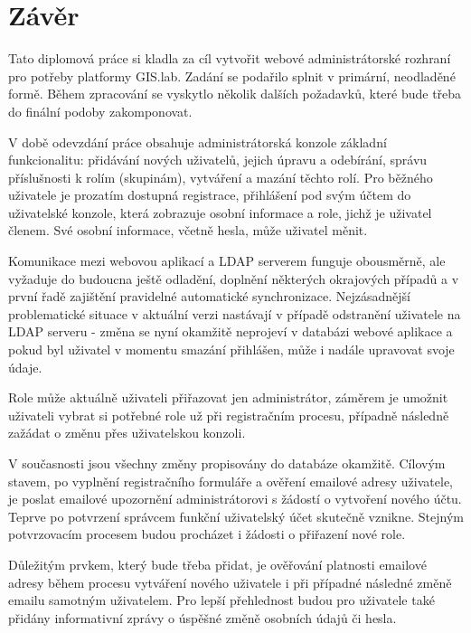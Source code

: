 \chapter*{Závěr}
\label{5-zaver}


Tato diplomová práce si kladla za cíl vytvořit webové administrátorské rozhraní pro potřeby platformy GIS.lab. Zadání se podařilo splnit v primární, neodladěné formě. Během zpracování se vyskytlo několik dalších požadavků, které bude třeba do finální podoby zakomponovat.

V době odevzdání práce obsahuje administrátorská konzole základní funkcionalitu: přidávání nových uživatelů, jejich úpravu a odebírání, správu příslušnosti k rolím (skupinám), vytváření a mazání těchto rolí. Pro běžného uživatele je prozatím dostupná registrace, přihlášení pod svým účtem do uživatelské konzole, která zobrazuje osobní informace a role, jichž je uživatel členem. Své osobní informace, včetně hesla, může uživatel měnit. 

Komunikace mezi webovou aplikací a LDAP serverem funguje obousměrně, ale vyžaduje do budoucna ještě odladění, doplnění některých okrajových případů a v první řadě zajištění pravidelné automatické synchronizace. Nejzásadnější problematické situace v aktuální verzi nastávají v případě odstranění uživatele na LDAP serveru - změna se nyní okamžitě neprojeví v databázi webové aplikace a pokud byl uživatel v momentu smazání přihlášen, může i nadále upravovat svoje údaje.

Role může aktuálně uživateli přiřazovat jen administrátor, záměrem je umožnit uživateli vybrat si potřebné role už při registračním procesu, případně následně zažádat o změnu přes uživatelskou konzoli.

V současnosti jsou všechny změny propisovány do databáze okamžitě. Cílovým stavem, po vyplnění registračního formuláře a ověření emailové adresy uživatele, je poslat emailové upozornění administrátorovi s žádostí o vytvoření nového účtu. Teprve po potvrzení správcem funkční uživatelský účet skutečně vznikne. Stejným potvrzovacím procesem budou procházet i žádosti o přiřazení nové role.

Důležitým prvkem, který bude třeba přidat, je ověřování platnosti emailové adresy během procesu vytváření nového uživatele i při případné následné změně emailu samotným uživatelem. Pro lepší přehlednost budou pro uživatele také přidány informativní zprávy o úspěšné změně osobních údajů či hesla.

